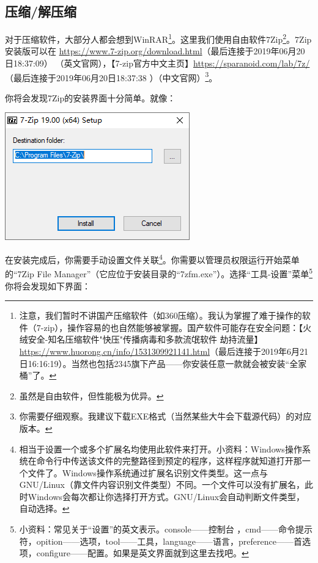 \subsection{压缩/解压缩}
对于压缩软件，大部分人都会想到WinRAR\footnote{注意，我们暂时不讲国产压缩软件（如360压缩）。我认为掌握了难于操作的软件（7-zip），操作容易的也自然能够被掌握。国产软件可能存在安全问题：【火绒安全-知名压缩软件"快压"传播病毒和多款流氓软件 劫持流量】\url{https://www.huorong.cn/info/1531309921141.html}（最后连接于2019年6月21日16:16:19）。当然也包括2345旗下产品——你安装任意一款就会被安装“全家桶”了。}。这里我们使用自由软件7Zip\footnote{虽然是自由软件，但性能极为优异。}。7Zip安装版可以在 \url{https://www.7-zip.org/download.html}（最后连接于2019年06月20日18:37:09） （英文官网），【7-zip官方中文主页】\url{https://sparanoid.com/lab/7z/}（最后连接于2019年06月20日18:37:38 ）（中文官网）\footnote{你需要仔细观察。我建议下载EXE格式（当然某些大牛会下载源代码）的对应版本。}。\par
你将会发现7Zip的安装界面十分简单。就像：
\begin{center}
	\includegraphics[scale=0.7]{pic/7zipinst}
\end{center} \par
在安装完成后，你需要手动设置文件关联\footnote{相当于设置一个或多个扩展名均使用此软件来打开。小资料：Windows操作系统在命令行中传送该文件的完整路径到预定的程序，这样程序就知道打开那一个文件了。Windows操作系统通过扩展名识别文件类型。这一点与GNU/Linux（靠文件内容识别文件类型）不同。一个文件可以没有扩展名，此时Windows会每次都让你选择打开方式。GNU/Linux会自动判断文件类型，自动选择。}。你需要以管理员权限运行开始菜单的“7Zip File Manager”（它应位于安装目录的“7zfm.exe”）。选择“工具-设置”菜单\footnote{小资料：常见关于“设置”的英文表示。console——控制台 ，cmd——命令提示符，opition——选项，tool——工具，language——语言，preference——首选项，configure——配置。如果是英文界面就到这里去找吧。}你将会发现如下界面：

